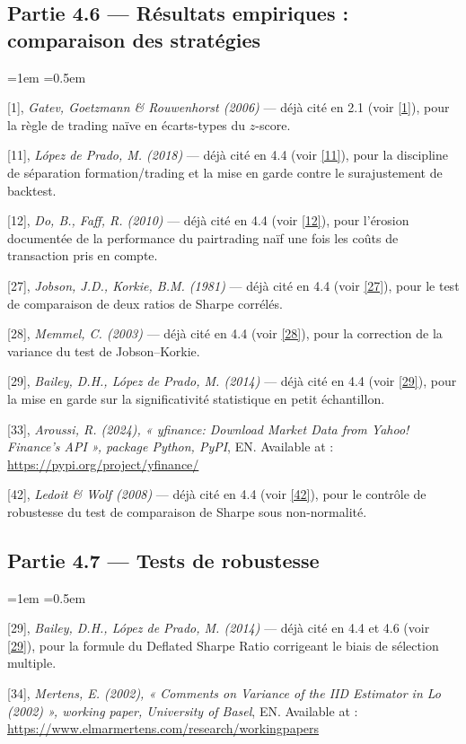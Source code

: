 \documentclass{article}
\begin{document}
\subsection*{Partie 4.6 --- Résultats empiriques : comparaison des stratégies}
\begin{list}{}{\leftmargin=1em \itemsep=0.5em}
\item \hypertarget{ref1}{} [1], \textit{Gatev, Goetzmann \& Rouwenhorst (2006)} --- déjà cité en 2.1 (voir \hyperlink{ref1}{[1]}), pour la règle de trading naïve en écarts-types du $z$-score.
\item \hypertarget{ref11}{} [11], \textit{López de Prado, M. (2018)} --- déjà cité en 4.4 (voir \hyperlink{ref11}{[11]}), pour la discipline de séparation formation/trading et la mise en garde contre le surajustement de backtest.
\item \hypertarget{ref12}{} [12], \textit{Do, B., Faff, R. (2010)} --- déjà cité en 4.4 (voir \hyperlink{ref12}{[12]}), pour l'érosion documentée de la performance du pairtrading naïf une fois les coûts de transaction pris en compte.
\item \hypertarget{ref27}{} [27], \textit{Jobson, J.D., Korkie, B.M. (1981)} --- déjà cité en 4.4 (voir \hyperlink{ref27}{[27]}), pour le test de comparaison de deux ratios de Sharpe corrélés.
\item \hypertarget{ref28}{} [28], \textit{Memmel, C. (2003)} --- déjà cité en 4.4 (voir \hyperlink{ref28}{[28]}), pour la correction de la variance du test de Jobson--Korkie.
\item \hypertarget{ref29}{} [29], \textit{Bailey, D.H., López de Prado, M. (2014)} --- déjà cité en 4.4 (voir \hyperlink{ref29}{[29]}), pour la mise en garde sur la significativité statistique en petit échantillon.
\item \hypertarget{ref33}{} [33], \textit{Aroussi, R. (2024), « yfinance: Download Market Data from Yahoo! Finance's API », package Python, PyPI}, EN. Available at : \url{https://pypi.org/project/yfinance/}
\item \hypertarget{ref42}{} [42], \textit{Ledoit \& Wolf (2008)} --- déjà cité en 4.4 (voir \hyperlink{ref42}{[42]}), pour le contrôle de robustesse du test de comparaison de Sharpe sous non-normalité.
\end{list}
\subsection*{Partie 4.7 --- Tests de robustesse}
\begin{list}{}{\leftmargin=1em \itemsep=0.5em}
\item \hypertarget{ref29b}{} [29], \textit{Bailey, D.H., López de Prado, M. (2014)} --- déjà cité en 4.4 et 4.6 (voir \hyperlink{ref29}{[29]}), pour la formule du Deflated Sharpe Ratio corrigeant le biais de sélection multiple.
\item \hypertarget{ref34}{} [34], \textit{Mertens, E. (2002), « Comments on Variance of the IID Estimator in Lo (2002) », working paper, University of Basel}, EN. Available at : \url{https://www.elmarmertens.com/research/workingpapers}
\end{list}
\end{document}
